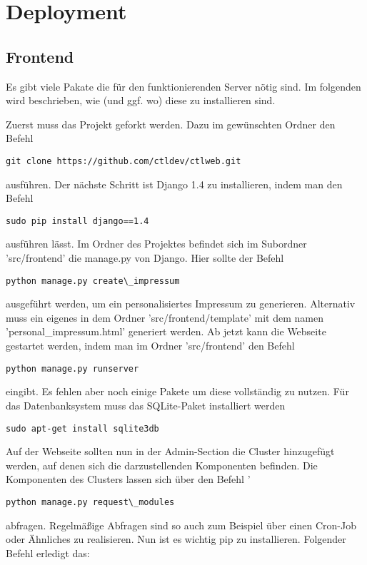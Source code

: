 \section{Deployment}
\subsection{Frontend}
Es gibt viele Pakate die für den funktionierenden Server nötig sind. Im folgenden wird beschrieben, wie (und ggf. wo) diese zu installieren sind. 

Zuerst muss das Projekt geforkt werden. Dazu im gewünschten Ordner den Befehl 
\begin{lstlisting}
git clone https://github.com/ctldev/ctlweb.git 
\end{lstlisting}
ausführen. 
Der nächste Schritt ist Django 1.4 zu installieren, indem man den Befehl
\begin{lstlisting}
sudo pip install django==1.4
\end{lstlisting}
ausführen lässt.
Im Ordner des
Projektes befindet sich im Subordner 'src/frontend' die manage.py von Django.
Hier sollte der Befehl 
\begin{lstlisting}
python manage.py create\_impressum
\end{lstlisting}
 ausgeführt werden, um ein personalisiertes Impressum zu generieren. Alternativ muss ein eigenes 
in dem Ordner 'src/frontend/template' mit dem namen
'personal\_impressum.html' generiert werden. Ab jetzt kann die Webseite gestartet
werden, indem man im Ordner 'src/frontend' den Befehl
\begin{lstlisting}
python manage.py runserver 
\end{lstlisting}
eingibt. Es fehlen aber noch einige Pakete um diese vollständig zu nutzen.
Für das Datenbanksystem muss das SQLite-Paket installiert werden
\begin{lstlisting}
sudo apt-get install sqlite3db
\end{lstlisting}
Auf der Webseite sollten nun in der Admin-Section die Cluster hinzugefügt werden,
auf denen sich die darzustellenden Komponenten befinden. Die Komponenten des
Clusters lassen sich über den Befehl '
\begin{lstlisting}
python manage.py request\_modules
\end{lstlisting}
abfragen. Regelmäßige Abfragen sind so auch zum Beispiel über einen Cron-Job
oder Ähnliches zu realisieren.
Nun ist es wichtig pip zu installieren. Folgender Befehl erledigt das:
